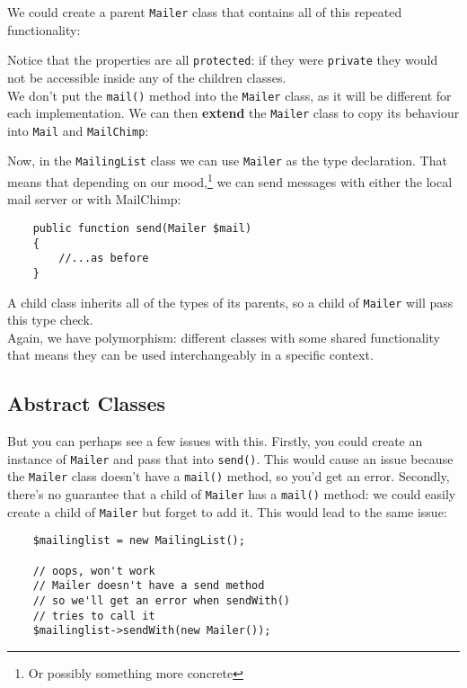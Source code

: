 We could create a parent \texttt{Mailer} class that contains all of this repeated functionality:


Notice that the properties are all \texttt{protected}: if they were \texttt{private} they would not be accessible inside any of the children classes.
\\

We don't put the \texttt{mail()} method into the \texttt{Mailer} class, as it will be different for each implementation. We can then \textbf{extend} the \texttt{Mailer} class to copy its behaviour into \texttt{Mail} and \texttt{MailChimp}:


Now, in the \texttt{MailingList} class we can use \texttt{Mailer} as the type declaration. That means that depending on our mood,\footnote{Or possibly something more concrete} we can send messages with either the local mail server or with MailChimp:

\begin{verbatim}
    public function send(Mailer $mail)
    {
        //...as before
    }
\end{verbatim}

A child class inherits all of the types of its parents, so a child of \texttt{Mailer} will pass this type check.
\\

Again, we have polymorphism: different classes with some shared functionality that means they can be used interchangeably in a specific context.


\subsection{Abstract Classes}

But you can perhaps see a few issues with this. Firstly, you could create an instance of \texttt{Mailer} and pass that into \texttt{send()}. This would cause an issue because the \texttt{Mailer} class doesn't have a \texttt{mail()} method, so you'd get an error. Secondly, there's no guarantee that a child of \texttt{Mailer} has a \texttt{mail()} method: we could easily create a child of \texttt{Mailer} but forget to add it. This would lead to the same issue:

\begin{verbatim}
    $mailinglist = new MailingList();

    // oops, won't work
    // Mailer doesn't have a send method
    // so we'll get an error when sendWith()
    // tries to call it
    $mailinglist->sendWith(new Mailer());
\end{verbatim}


